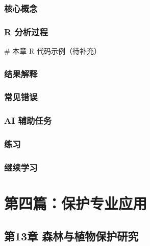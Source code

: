 \documentclass[
  letterpaper,
]{scrbook}
\newenvironment{Shaded}{\begin{snugshade}}{\end{snugshade}}
\newcommand{\CommentTok}[1]{\textcolor[rgb]{0.37,0.37,0.37}{#1}}
\begin{document}
\section{核心概念}\label{ux6838ux5fc3ux6982ux5ff5-2}

\section{R 分析过程}\label{r-ux5206ux6790ux8fc7ux7a0b-4}

\begin{Shaded}
\begin{Highlighting}[]
\CommentTok{\# 本章 R 代码示例（待补充）}
\end{Highlighting}
\end{Shaded}

\section{结果解释}\label{ux7ed3ux679cux89e3ux91ca-2}

\section{常见错误}\label{ux5e38ux89c1ux9519ux8bef-9}

\section{AI 辅助任务}\label{ai-ux8f85ux52a9ux4efbux52a1-3}

\section{练习}\label{ux7ec3ux4e60-11}

\section{继续学习}\label{ux7ee7ux7eedux5b66ux4e60-3}

\part{第四篇：保护专业应用}

\chapter{第13章
森林与植物保护研究}\label{ux7b2c13ux7ae0-ux68eeux6797ux4e0eux690dux7269ux4fddux62a4ux7814ux7a76}
\end{document}
